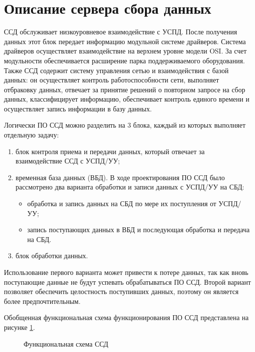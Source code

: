 \section{Описание сервера сбора данных}

ССД обслуживает низкоуровневое взаимодействие с УСПД. После получения данных этот блок передает информацию модульной системе драйверов. Система драйверов осуществляет взаимодействие на верхнем уровне модели OSI. За счет модульности обеспечивается расширение парка поддерживаемого оборудования. Также ССД содержит систему управления сетью и взаимодействия с базой данных: он осуществляет контроль работоспособности сети, выполняет отбраковку данных, отвечает за принятие решений о повторном запросе на сбор данных, классифицирует информацию, обеспечивает контроль единого времени и осуществляет запись информации в базу данных.

Логически ПО ССД можно разделить на 3 блока, каждый из которых выполняет отдельную задачу:
\begin{enumerate}
\item блок контроля приема и передачи данных, который отвечает за взаимодействие ССД с УСПД/УУ;
\item временная база данных (ВБД). В ходе проектирования ПО ССД было рассмотрено два варианта обработки и записи данных с УСПД/УУ на СБД: 
\begin{itemize}
\item обработка и запись данных на СБД по мере их поступления от УСПД/УУ;
\item запись поступающих данных в ВБД и последующая обработка и передача на СБД.
\end{itemize}
\item блок обработки данных.
\end{enumerate}

Использование первого варианта может привести к потере данных, так как вновь поступающие данные не будут успевать обрабатываться ПО ССД. Второй вариант позволяет обеспечить целостность поступивших данных, поэтому он является более предпочтительным.

Обобщенная функциональная схема функционирования ПО ССД представлена на рисунке \ref{sh_ssd:sh_ssd}.

\begin{figure}[h!]
 \caption{Функциональная схема ССД}
 \label{sh_ssd:sh_ssd}
\end{figure}
